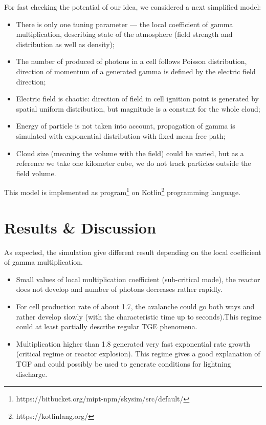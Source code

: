 \documentclass[%
 aip,
cp,  %
 amsmath,amssymb,%
 reprint,%
]{revtex4-2}
\begin{document}
For fast checking the potential of our idea, we considered a next simplified model:  
\begin{itemize}
	\item There is only one tuning parameter --- the local coefficient of gamma multiplication, describing state of the atmosphere (field strength and distribution as well as density);
	\item The number of produced of photons in a cell follows Poisson distribution, direction of momentum of a generated gamma is defined by the electric field direction;
	\item Electric field is chaotic: direction of field in cell ignition point is generated by spatial uniform distribution, but magnitude is a constant for the whole cloud;
	\item Energy of particle is not taken into account, propagation of gamma is simulated with exponential distribution with fixed mean free path;
	\item Cloud size (meaning the volume with the field) could be varied, but as a reference we take one kilometer cube, we do not track particles outside the field volume. 
\end{itemize}
This model is implemented as program\footnote{https://bitbucket.org/mipt-npm/skysim/src/default/}  on Kotlin\footnote{https://kotlinlang.org/} programming language. 

\section{Results \& Discussion}

As expected, the simulation give different result depending on the local coefficient of gamma multiplication. 
\begin{itemize}
    \item Small values of local multiplication coefficient (sub-critical mode), the reactor does not develop and number of photons decreases rather rapidly.
    \item For cell production rate of about 1.7, the avalanche could go both ways and rather develop slowly (with the characteristic time up to seconds).This regime could at least partially describe regular TGE phenomena.
    \item Multiplication higher than 1.8 generated very fast exponential rate growth (critical regime or reactor explosion). This regime gives a good explanation of TGF and could possibly be used to generate conditions for lightning discharge.
\end{itemize}
\end{document}
